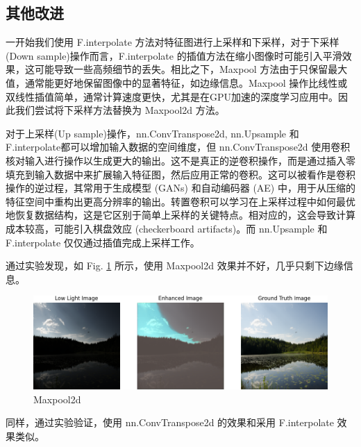 \documentclass[a4paper]{ctexart}
\begin{document}
		\subsection{其他改进}
		
		一开始我们使用 F.interpolate 方法对特征图进行上采样和下采样，对于下采样(Down sample)操作而言，F.interpolate 的插值方法在缩小图像时可能引入平滑效果，这可能导致一些高频细节的丢失。相比之下，Maxpool 方法由于只保留最大值，通常能更好地保留图像中的显著特征，如边缘信息。Maxpool 操作比线性或双线性插值简单，通常计算速度更快，尤其是在GPU加速的深度学习应用中。因此我们尝试将下采样方法替换为 Maxpool2d 方法。
		
		对于上采样(Up sample)操作，nn.ConvTranspose2d, nn.Upsample 和 F.interpolate都可以增加输入数据的空间维度，但 nn.ConvTranspose2d 使用卷积核对输入进行操作以生成更大的输出。这不是真正的逆卷积操作，而是通过插入零填充到输入数据中来扩展输入特征图，然后应用正常的卷积。这可以被看作是卷积操作的逆过程，其常用于生成模型 (GANs) 和自动编码器 (AE) 中，用于从压缩的特征空间中重构出更高分辨率的输出。转置卷积可以学习在上采样过程中如何最优地恢复数据结构，这是它区别于简单上采样的关键特点。相对应的，这会导致计算成本较高，可能引入棋盘效应 (checkerboard artifacts)。而 nn.Upsample 和 F.interpolate 仅仅通过插值完成上采样工作。
		
		通过实验发现，如 Fig. \ref{fig: Maxpool2d} 所示，使用 Maxpool2d 效果并不好，几乎只剩下边缘信息。
		
		\begin{figure}[htbp]
			\centering
			\includegraphics[width=\linewidth]{picture/LLIE/Experiment/Maxpool2d}
			\caption{Maxpool2d}
			\label{fig: Maxpool2d}
		\end{figure}
		
		同样，通过实验验证，使用 nn.ConvTranspose2d 的效果和采用 F.interpolate 效果类似。
		
		\renewcommand{\refname}{References}
		
		
			
			
\end{document}
